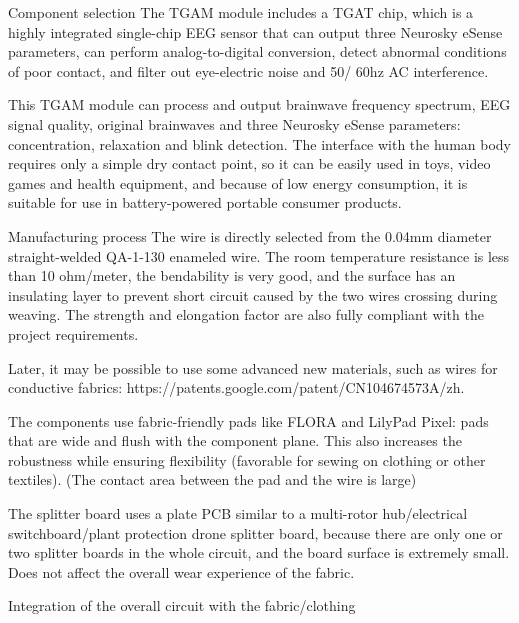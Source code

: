 \documentclass[final]{beamer}
\begin{document}
\begin{frame}[t, fragile = singleslide]{}
\begin{columns}[t]
\begin{column}{0.45\textwidth}
\begin{block}{Component selection}
The TGAM module includes a TGAT chip, which is a highly integrated single-chip EEG sensor that can output three Neurosky eSense parameters, can perform analog-to-digital conversion, detect abnormal conditions of poor contact, and filter out eye-electric noise and 50/ 60hz AC interference.

This TGAM module can process and output brainwave frequency spectrum, EEG signal quality, original brainwaves and three Neurosky eSense parameters: concentration, relaxation and blink detection. The interface with the human body requires only a simple dry contact point, so it can be easily used in toys, video games and health equipment, and because of low energy consumption, it is suitable for use in battery-powered portable consumer products.
\end{block}



\begin{block}{Manufacturing process}
The wire is directly selected from the 0.04mm diameter straight-welded QA-1-130 enameled wire. The room temperature resistance is less than 10 ohm/meter, the bendability is very good, and the surface has an insulating layer to prevent short circuit caused by the two wires crossing during weaving. The strength and elongation factor are also fully compliant with the project requirements.

Later, it may be possible to use some advanced new materials, such as wires for conductive fabrics: https://patents.google.com/patent/CN104674573A/zh.

The components use fabric-friendly pads like FLORA and LilyPad Pixel: pads that are wide and flush with the component plane. This also increases the robustness while ensuring flexibility (favorable for sewing on clothing or other textiles). (The contact area between the pad and the wire is large)

The splitter board uses a plate PCB similar to a multi-rotor hub/electrical switchboard/plant protection drone splitter board, because there are only one or two splitter boards in the whole circuit, and the board surface is extremely small. Does not affect the overall wear experience of the fabric.

Integration of the overall circuit with the fabric/clothing


\end{block}
\end{column}
\end{columns}
\end{frame}
\end{document}
